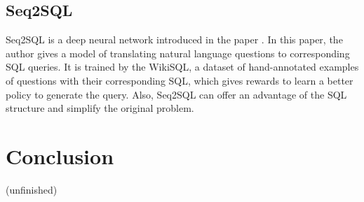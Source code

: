 \subsection{Seq2SQL}

Seq2SQL is a deep neural network introduced in the paper \cite{yin2015neural}. In this paper, the author gives a model of translating natural language questions to corresponding SQL queries. It is trained by the WikiSQL, a dataset of hand-annotated examples of questions with their corresponding SQL, which gives rewards to learn a better policy to generate the query. Also, Seq2SQL can offer an advantage of the SQL structure and simplify the original problem.

\section{Conclusion}

(unfinished)